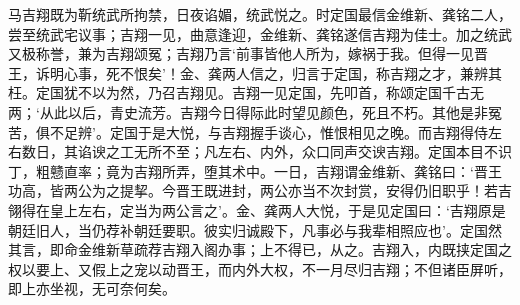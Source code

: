 \documentclass[]{article}
\begin{document}
马吉翔既为靳统武所拘禁，日夜谄媚，统武悦之。时定国最信金维新、龚铭二人，尝至统武宅议事；吉翔一见，曲意逢迎，金维新、龚铭遂信吉翔为佳士。加之统武又极称誉，兼为吉翔颂冤；吉翔乃言`前事皆他人所为，嫁祸于我。但得一见晋王，诉明心事，死不恨矣'！金、龚两人信之，归言于定国，称吉翔之才，兼辨其枉。定国犹不以为然，乃召吉翔见。吉翔一见定国，先叩首，称颂定国千古无两；`从此以后，青史流芳。吉翔今日得际此时望见颜色，死且不朽。其他是非冤苦，俱不足辨'。定国于是大悦，与吉翔握手谈心，惟恨相见之晚。而吉翔得侍左右数日，其谄谀之工无所不至；凡左右、内外，众口同声交谀吉翔。定国本目不识丁，粗戆直率；竟为吉翔所弄，堕其术中。一日，吉翔谓金维新、龚铭曰：`晋王功高，皆两公为之提挈。今晋王既进封，两公亦当不次封赏，安得仍旧职乎！若吉翎得在皇上左右，定当为两公言之'。金、龚两人大悦，于是见定国曰：`吉翔原是朝廷旧人，当仍荐补朝廷要职。彼实归诚殿下，凡事必与我辈相照应也'。定国然其言，即命金维新草疏荐吉翔入阁办事；上不得已，从之。吉翔入，内既挟定国之权以要上、又假上之宠以动晋王，而内外大权，不一月尽归吉翔；不但诸臣屏听，即上亦坐视，无可奈何矣。
\end{document}

